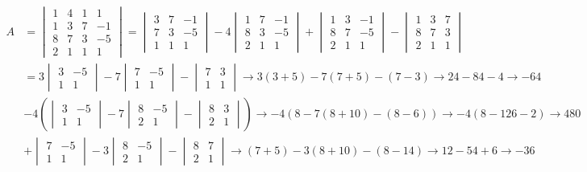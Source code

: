 \documentclass[
  letterpaper,
  DIV=11,
  numbers=noendperiod]{scrartcl}
\begin{document}
\begin{align*}
A &= \begin{vmatrix} 1 & 4 & 1 & 1 \\ 1 & 3 & 7 & -1 \\ 8 & 7 & 3 & -5 \\ 2 & 1 & 1 & 1\end{vmatrix} = \begin{vmatrix} 3 & 7 & -1 \\ 7 & 3 & -5 \\ 1 & 1 & 1 \end{vmatrix} -4 \begin{vmatrix} 1 & 7 & -1 \\ 8 & 3 & -5 \\ 2 & 1 & 1 \end{vmatrix} + \begin{vmatrix} 1 & 3 & -1 \\ 8 & 7 & -5 \\ 2 & 1 & 1 \end{vmatrix} - \begin{vmatrix} 1 & 3 & 7 \\ 8 & 7 & 3 \\ 2 & 1 & 1 \end{vmatrix} \\
&= 3\begin{vmatrix} 3 & -5 \\ 1 & 1 \end{vmatrix} -7\begin{vmatrix} 7 & -5 \\ 1 & 1 \end{vmatrix} - \begin{vmatrix} 7 & 3 \\ 1 & 1 \end{vmatrix} \rightarrow 3(3+5)-7(7+5)-(7-3) \rightarrow 24-84-4 \rightarrow -64\\ 
&-4\left(\begin{vmatrix}3 & -5 \\ 1 & 1\end{vmatrix} - 7\begin{vmatrix} 8 & -5 \\ 2 & 1 \end{vmatrix} - \begin{vmatrix}8 & 3 \\ 2 & 1 \end{vmatrix}\right) \rightarrow -4\left(8-7(8+10)-(8-6)\right) \rightarrow -4(8-126-2) \rightarrow 480 \\ 
&+ \begin{vmatrix}7 & -5 \\ 1 & 1 \end{vmatrix} -3\begin{vmatrix}8 & -5 \\ 2 & 1 \end{vmatrix} - \begin{vmatrix} 8 & 7 \\ 2 & 1 \end{vmatrix} \rightarrow (7+5)-3(8+10)-(8-14) \rightarrow 12-54+6 \rightarrow -36\\

\end{align*}
\end{document}
